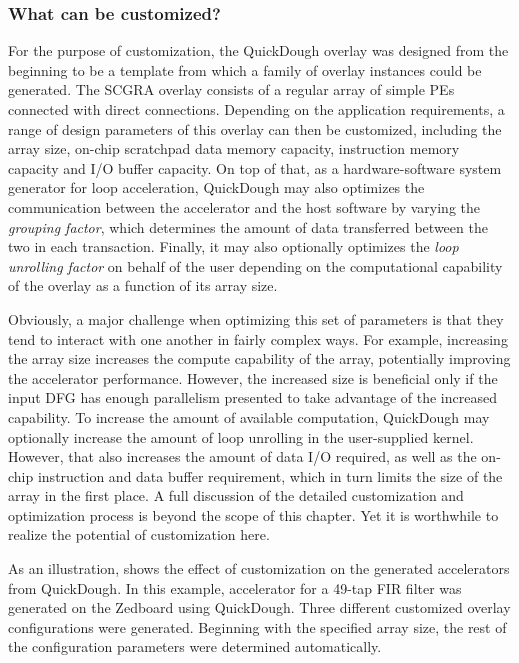 \subsubsection{What can be customized?}
For the purpose of customization, the QuickDough overlay was designed from the beginning to be a template from which a family of overlay instances could be generated.
The SCGRA overlay consists of a regular array of simple PEs connected with direct connections.
Depending on the application requirements, a range of design parameters of this overlay can then be customized, including the array size, on-chip scratchpad data memory capacity, instruction memory capacity and I/O buffer capacity.
On top of that, as a hardware-software system generator for loop acceleration, QuickDough may also optimizes the communication between the accelerator and the host software by varying the \emph{grouping factor}, which determines the amount of data transferred between the two in each transaction.
Finally, it may also optionally optimizes the \emph{loop unrolling factor} on behalf of the user depending on the computational capability of the overlay as a function of its array size.

Obviously, a major challenge when optimizing this set of parameters is that they tend to interact with one another in fairly complex ways.
For example, increasing the array size increases the compute capability of the array, potentially improving the accelerator performance.  However, the increased size is beneficial only if the input DFG has enough parallelism presented to take advantage of the increased capability.
To increase the amount of available computation, QuickDough may optionally increase the amount of loop unrolling in the user-supplied kernel.
However, that also increases the amount of data I/O required, as well as the on-chip instruction and data buffer requirement, which in turn limits the size of the array in the first place.
A full discussion of the detailed customization and optimization process is beyond the scope of this chapter.  Yet it is worthwhile to realize the potential of customization here.

As an illustration,  shows the effect of customization on the generated accelerators from QuickDough.
In this example, accelerator for a 49-tap FIR filter was generated on the Zedboard using QuickDough.
Three different customized overlay configurations were generated.
Beginning with the specified array size, the rest of the configuration parameters were determined automatically. 


